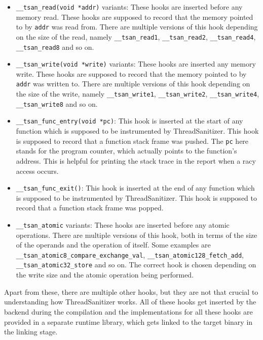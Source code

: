 \documentclass{btp}
\begin{document}
\begin{itemize}
	\item \texttt{\_\_tsan\_read(void *addr)} variants: These hooks are inserted before any memory read. These hooks are supposed to record that the memory pointed to by \texttt{addr} was read from. There are multiple versions of this hook depending on the size of the read, namely \texttt{\_\_tsan\_read1}, \texttt{\_\_tsan\_read2}, \texttt{\_\_tsan\_read4}, \texttt{\_\_tsan\_read8} and so on.
	\item \texttt{\_\_tsan\_write(void *write)} variants: These hooks are inserted any memory write. These hooks are supposed to record that the memory pointed to by \texttt{addr} was written to. There are multiple versions of this hook depending on the size of the write, namely \texttt{\_\_tsan\_write1}, \texttt{\_\_tsan\_write2}, \texttt{\_\_tsan\_write4}, \texttt{\_\_tsan\_write8} and so on.
	\item \texttt{\_\_tsan\_func\_entry(void *pc)}: This hook is inserted at the start of any function which is supposed to be instrumented by ThreadSanitizer. This hook is supposed to record that a function stack frame was pushed. The \texttt{pc} here stands for the program counter, which actually points to the function's address. This is helpful for printing the stack trace in the report when a racy access occurs.
	\item \texttt{\_\_tsan\_func\_exit()}: This hook is inserted at the end of any function which is supposed to be instrumented by ThreadSanitizer. This hook is supposed to record that a function stack frame was popped.
	\item \texttt{\_\_tsan\_atomic} variants: These hooks are inserted before any atomic operations. There are multiple versions of this hook, both in terms of the size of the operands and the operation of itself. Some examples are \texttt{\_\_tsan\_atomic8\_compare\_exchange\_val}, \texttt{\_\_tsan\_atomic128\_fetch\_add}, \texttt{\_\_tsan\_atomic32\_store} and so on. The correct hook is chosen depending on the write size and the atomic operation being performed.
\end{itemize}

Apart from these, there are multiple other hooks, but they are not that crucial to understanding how ThreadSanitizer works. All of these hooks get inserted by the backend during the compilation and the implementations for all these hooks are provided in a separate runtime library, which gets linked to the target binary in the linking stage.
\end{document}
